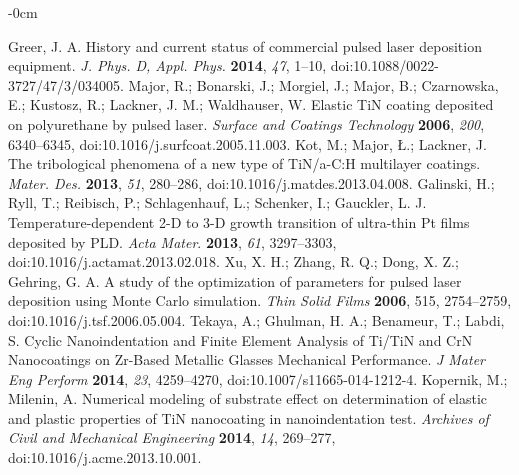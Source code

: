 \documentclass[journal,article,submit,pdftex,moreauthors]{Definitions/mdpi}
\begin{document}
 
 
 
\begin{adjustwidth}{-\extralength}{0cm}
 
\begin{thebibliography}{999}
Greer, J. A. History and current status of commercial pulsed laser deposition equipment. \textit{J. Phys. D, Appl. Phys.} \textbf{2014}, \textit{47}, 1–10, doi:10.1088/0022-3727/47/3/034005.
Major, R.; Bonarski, J.; Morgiel, J.; Major, B.; Czarnowska, E.; Kustosz, R.; Lackner, J. M.; Waldhauser, W. Elastic TiN coating deposited on polyurethane by pulsed laser. \textit{Surface and Coatings Technology} \textbf{2006}, \textit{200}, 6340–6345, doi:10.1016/j.surfcoat.2005.11.003.
Kot, M.; Major, Ł.; Lackner, J. The tribological phenomena of a new type of TiN/a-C:H multilayer coatings. \textit{Mater. Des.} \textbf{2013}, \textit{51}, 280–286, doi:10.1016/j.matdes.2013.04.008.
Galinski, H.; Ryll, T.; Reibisch, P.; Schlagenhauf, L.; Schenker, I.; Gauckler, L. J. Temperature-dependent 2-D to 3-D growth transition of ultra-thin Pt films deposited by PLD. \textit{Acta Mater}. \textbf{2013}, \textit{61}, 3297–3303, doi:10.1016/j.actamat.2013.02.018.
Xu, X. H.; Zhang, R. Q.; Dong, X. Z.; Gehring, G. A. A study of the optimization of parameters for pulsed laser deposition using Monte Carlo simulation. \textit{Thin Solid Films} \textbf{2006}, 515, 2754–2759, doi:10.1016/j.tsf.2006.05.004.
Tekaya, A.; Ghulman, H. A.; Benameur, T.; Labdi, S. Cyclic Nanoindentation and Finite Element Analysis of Ti/TiN and CrN Nanocoatings on Zr-Based Metallic Glasses Mechanical Performance. \textit{J Mater Eng Perform} \textbf{2014}, \textit{23}, 4259–4270, doi:10.1007/s11665-014-1212-4.
Kopernik, M.; Milenin, A. Numerical modeling of substrate effect on determination of elastic and plastic properties of TiN nanocoating in nanoindentation test. \textit{Archives of Civil and Mechanical Engineering} \textbf{2014}, \textit{14}, 269–277, doi:10.1016/j.acme.2013.10.001.

\end{thebibliography}
\end{adjustwidth}
\end{document}
